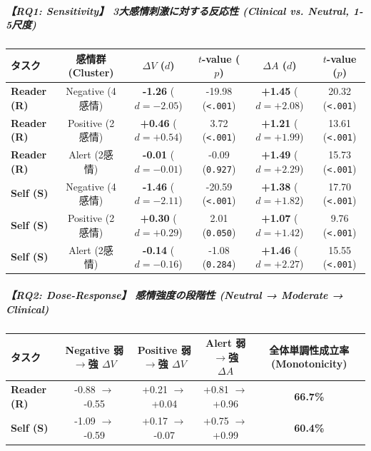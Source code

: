 \subparagraph{【RQ1: Sensitivity】 3大感情刺激に対する反応性 (Clinical vs. Neutral, 1-5尺度)}
\begin{center}
\small
\begin{tabular}{lccccc}
\toprule
\textbf{タスク} & \textbf{感情群 (Cluster)} & \textbf{$\Delta V$ ($d$)} & \textbf{$t$-value ($p$)} & \textbf{$\Delta A$ ($d$)} & \textbf{$t$-value ($p$)} \\
\midrule
\textbf{Reader (R)} & Negative (4感情) & \textbf{-1.26} ($d=-2.05$) & -19.98 (\texttt{<.001}) & \textbf{+1.45} ($d=+2.08$) & 20.32 (\texttt{<.001}) \\
\textbf{Reader (R)} & Positive (2感情) & \textbf{+0.46} ($d=+0.54$) & 3.72 (\texttt{<.001}) & \textbf{+1.21} ($d=+1.99$) & 13.61 (\texttt{<.001}) \\
\textbf{Reader (R)} & Alert (2感情) & \textbf{-0.01} ($d=-0.01$) & -0.09 (\texttt{0.927}) & \textbf{+1.49} ($d=+2.29$) & 15.73 (\texttt{<.001}) \\
\textbf{Self (S)} & Negative (4感情) & \textbf{-1.46} ($d=-2.11$) & -20.59 (\texttt{<.001}) & \textbf{+1.38} ($d=+1.82$) & 17.70 (\texttt{<.001}) \\
\textbf{Self (S)} & Positive (2感情) & \textbf{+0.30} ($d=+0.29$) & 2.01 (\texttt{0.050}) & \textbf{+1.07} ($d=+1.42$) & 9.76 (\texttt{<.001}) \\
\textbf{Self (S)} & Alert (2感情) & \textbf{-0.14} ($d=-0.16$) & -1.08 (\texttt{0.284}) & \textbf{+1.46} ($d=+2.27$) & 15.55 (\texttt{<.001}) \\
\bottomrule
\end{tabular}
\end{center}


\subparagraph{【RQ2: Dose-Response】 感情強度の段階性 (Neutral → Moderate → Clinical)}
\begin{center}
\small
\begin{tabular}{lcccc}
\toprule
\textbf{タスク} & \textbf{Negative 弱$\rightarrow$強 $\Delta V$} & \textbf{Positive 弱$\rightarrow$強 $\Delta V$} & \textbf{Alert 弱$\rightarrow$強 $\Delta A$} & \textbf{全体単調性成立率 (Monotonicity)} \\
\midrule
\textbf{Reader (R)} & -0.88 $\rightarrow$ -0.55 & +0.21 $\rightarrow$ +0.04 & +0.81 $\rightarrow$ +0.96 & \textbf{66.7\%} \\
\textbf{Self (S)} & -1.09 $\rightarrow$ -0.59 & +0.17 $\rightarrow$ -0.07 & +0.75 $\rightarrow$ +0.99 & \textbf{60.4\%} \\
\bottomrule
\end{tabular}
\end{center}


